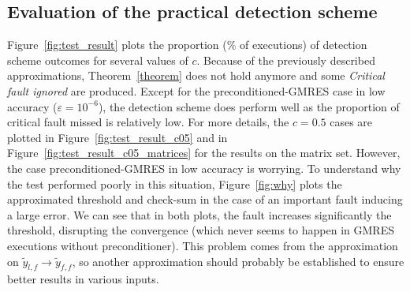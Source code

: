 \documentclass[twoside]{article}
\newcounter{fig}\setcounter{fig}{0}
\begin{document}
  \subsection{Evaluation of the practical detection scheme}\label{sec:implementable_evaluated}
  Figure~\ref{fig:test_result} plots the proportion (\% of executions) of detection scheme outcomes for several values of $c$. Because of the previously described approximations, Theorem~\ref{theorem} does not hold anymore and some \emph{Critical fault ignored} are produced. Except for the preconditioned-GMRES case in low accuracy ($\varepsilon = 10^{-6}$), the detection scheme does perform well as the proportion of critical fault missed is relatively low. For more details, the $c=0.5$ cases are plotted in Figure~\ref{fig:test_result_c05} and in Figure~\ref{fig:test_result_c05_matrices} for the results on the matrix set. However, the case preconditioned-GMRES in low accuracy is worrying. To understand why the test performed poorly in this situation, Figure~\ref{fig:why} plots the approximated threshold and check-sum in the case of an important fault inducing a large error. We can see that in both plots, the fault increases significantly the threshold, disrupting the convergence (which never seems to happen in GMRES executions without preconditioner). This problem comes from the approximation on $\widetilde{y}_{l, f} \rightarrow \widetilde{y}_{f, f}$, so another approximation should probably be established to ensure better results in various inputs.
\end{document}
